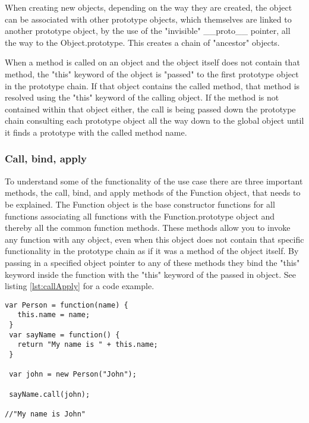 \documentclass[english]{ifimaster}
\begin{document}
\label{fig:prototypChain}

When creating new objects, depending on the way they are created, the object can be associated with other prototype objects, which themselves are linked to another prototype object, by the use of the "invisible" \_\_proto\_\_ pointer, all the way to the Object.prototype. This creates a chain of "ancestor" objects. 

When a method is called on an object and the object itself does not contain that method, the "this" keyword of the object is "passed" to the first prototype object in the prototype chain. If that object contains the called method, that method is resolved using the "this" keyword of the calling object. If the method is not contained within that object either, the call is being passed down the prototype chain consulting each prototype object all the way down to the global object until it finds a prototype with the called method name.


\subsubsection{Call, bind, apply}
\label{sec:callApply}
To understand some of the functionality of the use case there are three important methods, the call, bind, and apply methods of the Function object, that needs to be explained. The Function object is the base constructor functions for all functions associating all functions with the Function.prototype object and thereby all the common function methods. These methods allow you to invoke any function with any object, even when this object does not contain that specific functionality in the prototype chain as if it was a method of the object itself. By passing in a specified object pointer to any of these methods they bind the "this" keyword inside the function with the "this" keyword of the passed in object. See listing \ref{lst:callApply} for a code example.


\begin{lstlisting}[caption={Using Function.prototype.call.}, label={lst:callApply}]
 var Person = function(name) {
   this.name = name;
 }
 var sayName = function() {
   return "My name is " + this.name;
 }

 var john = new Person("John");
 
 sayName.call(john);

//"My name is John"

\end{lstlisting}
\end{document}
